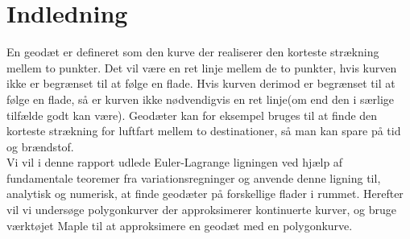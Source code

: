 \section{Indledning}

En geodæt er defineret som den kurve der realiserer den korteste strækning mellem to punkter. Det vil være en ret linje mellem de to punkter, hvis kurven ikke er begrænset til at følge en flade. Hvis kurven derimod er begrænset til at følge en flade, så er kurven ikke nødvendigvis en ret linje(om end den i særlige tilfælde godt kan være). Geodæter kan for eksempel bruges til at finde den korteste strækning for luftfart mellem to destinationer, så man kan spare på tid og brændstof. \\

Vi vil i denne rapport udlede Euler-Lagrange ligningen ved hjælp af fundamentale teoremer fra variationsregninger og anvende denne ligning til, analytisk og numerisk, at finde geodæter på forskellige flader i rummet. Herefter vil vi undersøge polygonkurver der approksimerer kontinuerte kurver, og bruge værktøjet Maple til at approksimere en geodæt med en polygonkurve.